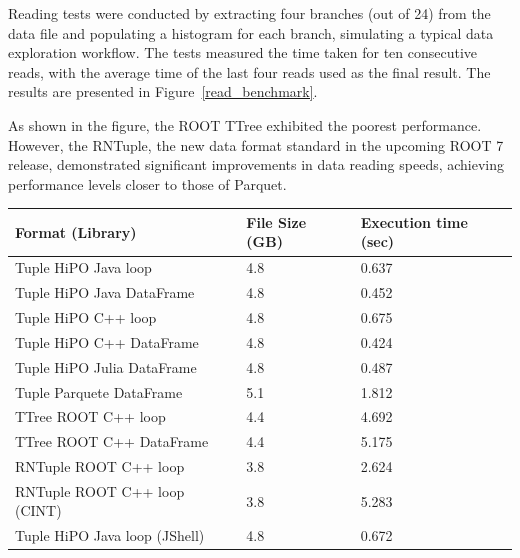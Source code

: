 \documentclass[preprint,12pt]{elsarticle}
\begin{document}
Reading tests were conducted by extracting four branches (out of 24) from the data file and populating a histogram for each branch, simulating a typical data exploration workflow. The tests measured the time taken for ten consecutive reads, with the average time of the last four reads used as the final result. The results are presented in Figure~\ref{read_benchmark}. 

As shown in the figure, the ROOT TTree exhibited the poorest performance. However, the RNTuple, the new data format standard in the upcoming ROOT 7 release, demonstrated significant improvements in data reading speeds, achieving performance levels closer to those of Parquet.

\begin{table}[h!]
\centering
\begin{tabular}{|p{7cm}|p{3.0cm}|p{4.0cm}|}
\hline
\textbf{Format (Library)} & File Size (GB)  &  Execution time (sec)  \\ \hline \hline
Tuple HiPO Java loop      & 4.8&0.637 \\ \hline
Tuple HiPO Java DataFrame &4.8& 0.452 \\ \hline
Tuple HiPO C++  loop      &4.8& 0.675 \\ \hline
Tuple HiPO C++  DataFrame &4.8& 0.424 \\ \hline
Tuple HiPO Julia  DataFrame &4.8& 0.487 \\ \hline
Tuple Parquete DataFrame  &5.1& 1.812 \\ \hline
TTree ROOT C++ loop       &4.4 & 4.692 \\ \hline
TTree ROOT C++ DataFrame  &4.4 & 5.175 \\ \hline
RNTuple ROOT C++ loop     &3.8& 2.624 \\ \hline
RNTuple ROOT C++ loop (CINT)    &3.8&  5.283 \\ \hline
Tuple HiPO Java loop (JShell)  &4.8&  0.672 \\ \hline

\end{tabular}
\end{table}
\end{document}
